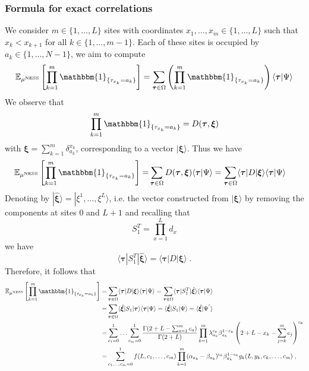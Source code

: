 \documentclass[10pt]{article}
\numberwithin{equation}{section}
\numberwithin{equation}{subsection}
\newcommand{\co}{\;,}
\newcommand{\dt}{\;.}
\begin{document}
\subsubsection{Formula for exact correlations}\label{correlation-section}
We consider $m\in \{1,\ldots,L\}$ sites with coordinates $x_{1},\ldots,x_{m}\in \{1,\ldots,L\}$ such that $x_{k}<x_{k+1}$ for all $k\in \{1,\ldots,m-1\}$. Each of these sites is occupied by $a_{k}\in\{1,\ldots,N-1\}$, we aim to compute
\begin{equation}
	\mathbb{E}_{\mu^{\text{NESS}}}\left[\prod_{k=1}^{m}\mathbbm{1}_{\{\tau_{x_{k}}=a_{k}\}}\right]=\sum_{\bm{\tau}\in \Omega}\left(\prod_{k=1}^{m}\mathbbm{1}_{\{\tau_{x_{k}}=a_{k}\}}\right)\langle\bm{\tau}|\Psi\rangle%
\end{equation}
We observe that 
\begin{equation}
	\prod_{k=1}^{m}\mathbbm{1}_{\{\tau_{x_{k}}=a_{k}\}}=D(\bm{\tau},\bm{\xi})
\end{equation}
with $\bm{\xi}=\sum_{k=1}^{m}\delta_{a_{k}}^{x_{k}}$, corresponding to a vector $|\bm{\xi}\rangle$. Thus we have
\begin{align}
	\mathbb{E}_{\mu^{\text{NESS}}}\left[\prod_{k=1}^{m}\mathbbm{1}_{\{\tau_{x_{k}}=a_{k}\}}\right]=&\sum_{\bm{\tau}\in \Omega}D(\bm{\tau},\bm{\xi})\langle\bm{\tau}|\Psi\rangle
	=\sum_{\bm{\tau}\in \Omega}\langle \bm{\tau}|D|\bm{\xi}\rangle\langle\bm{\tau}|\Psi\rangle
\end{align}
Denoting by $|\hat{\bm{\xi}}\rangle=|\xi^{1},\ldots,\xi^{L}\rangle$, i.e. the vector constructed from $|\bm{\xi}\rangle$ by removing the components at sites $0$ and $L+1$ and recalling that  
\begin{equation}
	S_{1}^{T}=\prod_{x=1}^{L}d_{x}
\end{equation} 
we have
\begin{equation}
	\langle \bm{\tau}|S_{1}^{T}|\hat{\bm{\xi}}\rangle=\langle \bm{\tau}|D|\bm{\xi}\rangle \dt
\end{equation}
Therefore, it follows that 
\begin{align}
	\mathbb{E}_{\mu^{\text{NESS}}}\left[\prod_{k=1}^{m}\mathbbm{1}_{\{\tau_{x_{k}}=a_{k}\}}\right]=& \sum_{\bm{\tau}\in \Omega}\langle \bm{\tau}|D|\bm{\xi}\rangle\langle\bm{\tau}|\Psi\rangle
	=\sum_{\bm{\tau}\in \Omega}\langle \bm{\tau}|S_{1}^{T}|\hat{\bm{\xi}}\rangle\langle\bm{\tau}|\Psi\rangle\nonumber\\
	=&\sum_{\bm{\tau}\in \Omega}\langle \hat{\bm{\xi}}|S_{1}|\bm{\tau}\rangle\langle\bm{\tau}|\Psi\rangle
	=\langle \hat{\bm{\xi}}|S_{1}|\Psi\rangle
	=\langle \hat{\bm{\xi}}|\Psi^{'}\rangle\nonumber\\
	=&\sum_{c_{1}=0}^{1}\ldots\sum_{c_{m}=0}^{1}\frac{\Gamma(2+L-\sum_{a=1}^{m}c_{a})}{\Gamma(2+L)}\prod_{k=1}^{m}\lambda_{a_{k}}^{c_{k}}\beta_{a_{k}}^{1-c_{k}}\left(2+L-x_{k}-\sum_{j=k}^{m}c_{j}\right)^{c_{k}}\nonumber\\
	=&\sum_{c_{1},\ldots,c_{m}=0}^{1}
	f(L,c_{1},\ldots,c_{m})\prod_{k=1}^{m}(\alpha_{a_{k}}-\beta_{a_{k}})^{c_{k}}\beta_{a_{k}}^{1-c_{k}}g_{k}(L,y_{k},c_{k},\ldots,c_{m})\co
\end{align}
\end{document}
